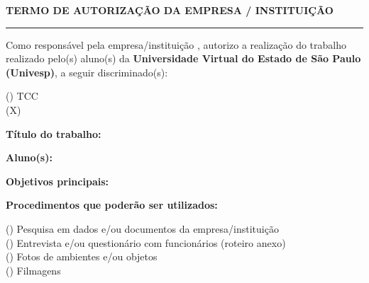 \begin{center}
    {\large\bfseries TERMO DE AUTORIZAÇÃO DA EMPRESA / INSTITUIÇÃO}\\[2pt]
    \rule{\textwidth}{0.8pt}
\end{center}

\vspace{0.3cm}

Como responsável pela empresa/instituição \textbf{\docempresa},
autorizo a realização do trabalho realizado pelo(s) aluno(s) da
\textbf{Universidade Virtual do Estado de São Paulo (Univesp)}, a seguir
discriminado(s):

\vspace{0.2cm}

\noindent
(\hspace{0.4cm}) TCC\\
(\hspace{0.1cm}X\hspace{0.1cm}) \doctipo

\vspace{0.2cm}

\noindent
\textbf{Título do trabalho:} \doctitulo

\noindent
\textbf{Aluno(s):}

\noindent
\fbox{\parbox{\dimexpr\textwidth-2\fboxsep-2\fboxrule}{%
\vspace{0.15cm}
\docautores
\vspace{0.15cm}
}}

\vspace{0.2cm}

\noindent
\textbf{Objetivos principais:}

\noindent
\fbox{\parbox{\dimexpr\textwidth-2\fboxsep-2\fboxrule}{%
\vspace{0.15cm}
\docobjeto
\vspace{0.15cm}
}}

\vspace{0.2cm}

\noindent
\textbf{Procedimentos que poderão ser utilizados:}

\noindent
(\hspace{0.4cm}) Pesquisa em dados e/ou documentos da empresa/instituição\\
(\hspace{0.4cm}) Entrevista e/ou questionário com funcionários (roteiro anexo)\\
(\hspace{0.4cm}) Fotos de ambientes e/ou objetos\\
(\hspace{0.4cm}) Filmagens

